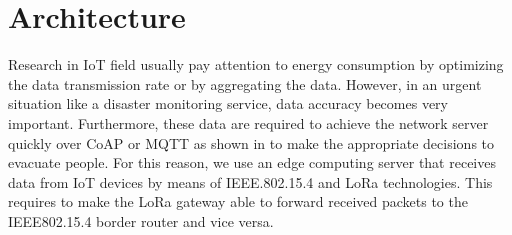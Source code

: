 \section{Architecture} \label{sec:Approach}

Research in \ac{IoT} field usually pay attention to energy consumption by optimizing the data transmission rate or by aggregating the data.
However,
	in an urgent situation like a disaster monitoring service,
	data accuracy becomes very important.
Furthermore,
	these data are required to achieve the network server quickly over \ac{CoAP} or \ac{MQTT} as shown in  to make the appropriate decisions to evacuate people.
For this reason,
	we use an edge computing server that receives data from \ac{IoT} devices by means of IEEE.802.15.4 and LoRa technologies.
This requires to make the LoRa gateway able to forward received packets to the IEEE802.15.4 border router and vice versa.


